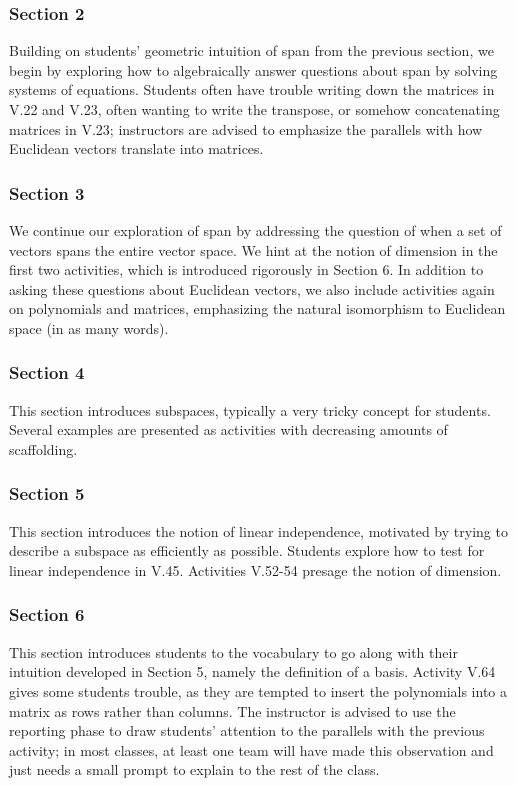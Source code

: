 \documentclass{article}
\begin{document}
\subsubsection*{Section 2}
Building on students' geometric intuition of span from the previous section, we begin by exploring how to algebraically answer questions about span by solving systems of equations.  Students often have trouble writing down the matrices in V.22 and V.23, often wanting to write the transpose, or somehow concatenating matrices in V.23; instructors are advised to emphasize the parallels with how Euclidean vectors translate into matrices.

\subsubsection*{Section 3}
We continue our exploration of span by addressing the question of when a set of vectors spans the entire vector space.  We hint at the notion of dimension in the first two activities, which is introduced rigorously in Section 6.  In addition to asking these questions about Euclidean vectors, we also include activities again on polynomials and matrices, emphasizing the natural isomorphism to Euclidean space (in as many words).  

\subsubsection*{Section 4}
This section introduces subspaces, typically a very tricky concept for students.  Several examples are presented as activities with decreasing amounts of scaffolding.

\subsubsection*{Section 5}
This section introduces the notion of linear independence, motivated by trying to describe a subspace as efficiently as possible.  Students explore how to test for linear independence in V.45.  Activities V.52-54 presage the notion of dimension.  

\subsubsection*{Section 6}
This section introduces students to the vocabulary to go along with their intuition developed in Section 5, namely the definition of a basis.  Activity V.64 gives some students trouble, as they are tempted to insert the polynomials into a matrix as rows rather than columns.  The instructor is advised to use the reporting phase to draw students' attention to the parallels with the previous activity; in most classes, at least one team will have made this observation and just needs a small prompt to explain to the rest of the class.  
\end{document}
